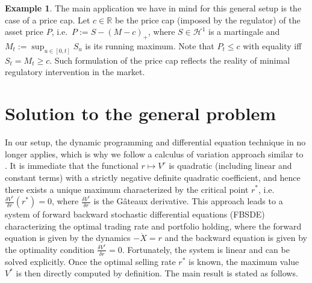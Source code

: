 \documentclass[openany,oneside]{article}
\theoremstyle{definition}
\newtheorem{eg}[thm]{Example}
\theoremstyle{remark}
\begin{document}
\begin{eg}
The main application we have in mind for this general setup is the case of a price cap. Let $c\in\mathbb{R}$ be the price cap (imposed by the regulator) of the asset price $P$, i.e.\ $P:=S-(M-c)_+$, where $S\in\mathcal{H}^1$ is a martingale and $M_t:=\sup_{u\in[0,t]} S_u$ is its running maximum. Note that $P_t\le c$ with equality iff $S_t=M_t\ge c$. Such formulation of the price cap reflects the reality of minimal regulatory intervention in the market.
\end{eg}


\section{Solution to the general problem}
In our setup, the dynamic programming and differential equation technique in \cite{lehalle2017incorporating} no longer applies, which is why we follow a calculus of variation approach similar to \cite{bouchard2017equilibrium}. It is immediate that the functional $r\mapsto V^r$ is quadratic (including linear and constant terms) with a strictly negative definite quadratic coefficient, and hence there exists a unique maximum characterized by the critical point $r^\ast$, i.e. $\frac{\delta V^r}{\delta r}(r^\ast) =0$, where $\frac{\delta V^r}{\delta r}$ is the G\^ateaux derivative. This approach leads to a system of forward backward stochastic differential equations (FBSDE) characterizing the optimal trading rate and portfolio holding, where the forward equation is given by the dynamics $-\dot{X}=r$ and the backward equation is given by the optimality condition $\frac{\delta V^r}{\delta r}=0$. Fortunately, the system is linear and can be solved explicitly. Once the optimal selling rate $r^\ast$ is known, the maximum value $V^\ast$ is then directly computed by definition. The main result is stated as follows.
\end{document}
